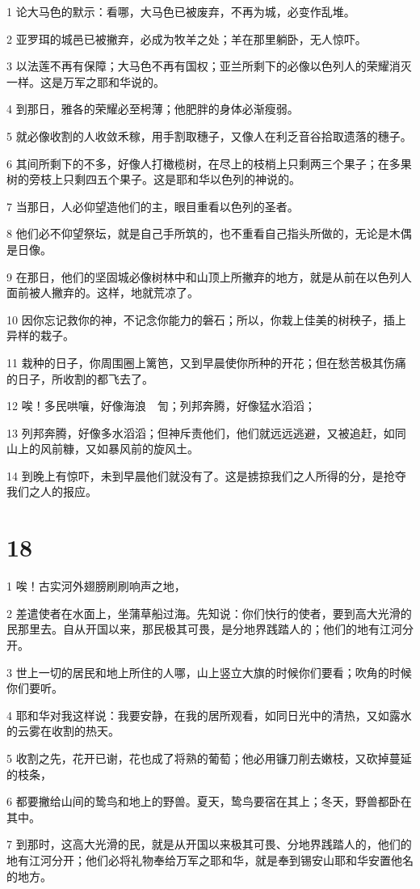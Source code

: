 \par 1 论大马色的默示：看哪，大马色已被废弃，不再为城，必变作乱堆。
\par 2 亚罗珥的城邑已被撇弃，必成为牧羊之处；羊在那里躺卧，无人惊吓。
\par 3 以法莲不再有保障；大马色不再有国权；亚兰所剩下的必像以色列人的荣耀消灭一样。这是万军之耶和华说的。
\par 4 到那日，雅各的荣耀必至枵薄；他肥胖的身体必渐瘦弱。
\par 5 就必像收割的人收敛禾稼，用手割取穗子，又像人在利乏音谷拾取遗落的穗子。
\par 6 其间所剩下的不多，好像人打橄榄树，在尽上的枝梢上只剩两三个果子；在多果树的旁枝上只剩四五个果子。这是耶和华以色列的神说的。
\par 7 当那日，人必仰望造他们的主，眼目重看以色列的圣者。
\par 8 他们必不仰望祭坛，就是自己手所筑的，也不重看自己指头所做的，无论是木偶是日像。
\par 9 在那日，他们的坚固城必像树林中和山顶上所撇弃的地方，就是从前在以色列人面前被人撇弃的。这样，地就荒凉了。
\par 10 因你忘记救你的神，不记念你能力的磐石；所以，你栽上佳美的树秧子，插上异样的栽子。
\par 11 栽种的日子，你周围圈上篱笆，又到早晨使你所种的开花；但在愁苦极其伤痛的日子，所收割的都飞去了。
\par 12 唉！多民哄嚷，好像海浪　訇；列邦奔腾，好像猛水滔滔；
\par 13 列邦奔腾，好像多水滔滔；但神斥责他们，他们就远远逃避，又被追赶，如同山上的风前糠，又如暴风前的旋风土。
\par 14 到晚上有惊吓，未到早晨他们就没有了。这是掳掠我们之人所得的分，是抢夺我们之人的报应。

\chapter{18}

\par 1 唉！古实河外翅膀刷刷响声之地，
\par 2 差遣使者在水面上，坐蒲草船过海。先知说：你们快行的使者，要到高大光滑的民那里去。自从开国以来，那民极其可畏，是分地界践踏人的；他们的地有江河分开。
\par 3 世上一切的居民和地上所住的人哪，山上竖立大旗的时候你们要看；吹角的时候你们要听。
\par 4 耶和华对我这样说：我要安静，在我的居所观看，如同日光中的清热，又如露水的云雾在收割的热天。
\par 5 收割之先，花开已谢，花也成了将熟的葡萄；他必用镰刀削去嫩枝，又砍掉蔓延的枝条，
\par 6 都要撇给山间的鸷鸟和地上的野兽。夏天，鸷鸟要宿在其上；冬天，野兽都卧在其中。
\par 7 到那时，这高大光滑的民，就是从开国以来极其可畏、分地界践踏人的，他们的地有江河分开；他们必将礼物奉给万军之耶和华，就是奉到锡安山耶和华安置他名的地方。

